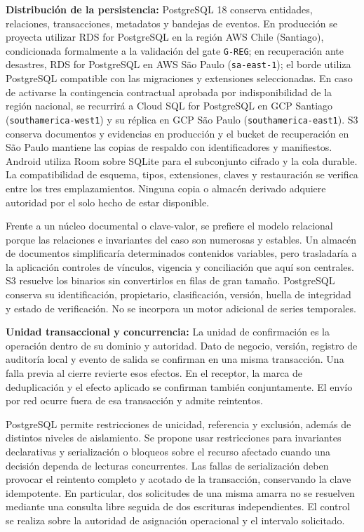 \textbf{Distribución de la persistencia:} PostgreSQL 18 conserva entidades, relaciones, transacciones, metadatos y bandejas de eventos. En producción se proyecta utilizar RDS for PostgreSQL en la región AWS Chile (Santiago), condicionada formalmente a la validación del gate \texttt{G-REG}; en recuperación ante desastres, RDS for PostgreSQL en AWS São Paulo (\texttt{sa-east-1}); el borde utiliza PostgreSQL compatible con las migraciones y extensiones seleccionadas. En caso de activarse la contingencia contractual aprobada por indisponibilidad de la región nacional, se recurrirá a Cloud SQL for PostgreSQL en GCP Santiago (\texttt{southamerica-west1}) y su réplica en GCP São Paulo (\texttt{southamerica-east1}). S3 conserva documentos y evidencias en producción y el bucket de recuperación en São Paulo mantiene las copias de respaldo con identificadores y manifiestos. Android utiliza Room sobre SQLite para el subconjunto cifrado y la cola durable. La compatibilidad de esquema, tipos, extensiones, claves y restauración se verifica entre los tres emplazamientos. Ninguna copia o almacén derivado adquiere autoridad por el solo hecho de estar disponible.

Frente a un núcleo documental o clave-valor, se prefiere el modelo relacional porque las relaciones e invariantes del caso son numerosas y estables. Un almacén de documentos simplificaría determinados contenidos variables, pero trasladaría a la aplicación controles de vínculos, vigencia y conciliación que aquí son centrales. S3 resuelve los binarios sin convertirlos en filas de gran tamaño. PostgreSQL conserva su identificación, propietario, clasificación, versión, huella de integridad y estado de verificación. No se incorpora un motor adicional de series temporales.

\textbf{Unidad transaccional y concurrencia:} La unidad de confirmación es la operación dentro de su dominio y autoridad. Dato de negocio, versión, registro de auditoría local y evento de salida se confirman en una misma transacción. Una falla previa al cierre revierte esos efectos. En el receptor, la marca de deduplicación y el efecto aplicado se confirman también conjuntamente. El envío por red ocurre fuera de esa transacción y admite reintentos.

PostgreSQL permite restricciones de unicidad, referencia y exclusión, además de distintos niveles de aislamiento. Se propone usar restricciones para invariantes declarativas y serialización o bloqueos sobre el recurso afectado cuando una decisión dependa de lecturas concurrentes. Las fallas de serialización deben provocar el reintento completo y acotado de la transacción, conservando la clave idempotente. En particular, dos solicitudes de una misma amarra no se resuelven mediante una consulta libre seguida de dos escrituras independientes. El control se realiza sobre la autoridad de asignación operacional y el intervalo solicitado.

